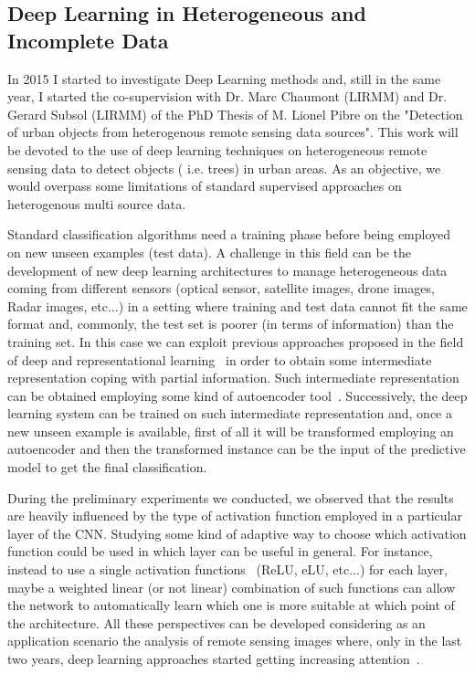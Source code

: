 \subsection{Deep Learning in Heterogeneous and Incomplete Data}
In 2015 I started to investigate Deep Learning methods and, still in the same year, I started the co-supervision with Dr. Marc Chaumont (LIRMM) and Dr. Gerard Subsol (LIRMM) of the PhD Thesis of M. Lionel Pibre on the "Detection of urban objects from heterogenous remote sensing data sources".
This work will be devoted to the use of deep learning techniques on heterogeneous remote sensing data to detect objects ( i.e. trees) in urban areas. As an objective, we would overpass some limitations of standard supervised approaches on heterogenous multi source data.

Standard classification algorithms need a training phase before being employed on new unseen examples (test data). A challenge in this field can be the development of new deep learning architectures to manage heterogeneous data coming from different sensors (optical sensor, satellite images, drone images, Radar images, etc...)  in a setting where training and test data cannot fit the same format and, commonly, the test set is poorer (in terms of information) than the training set. 
In this case we can exploit previous approaches proposed in the field of deep and representational learning~\cite{LeCun15,BengioCV13} in order to obtain some intermediate representation coping with partial information. Such intermediate representation can be obtained employing some kind of autoencoder tool~\cite{VincentLLBM10}.
Successively, the deep learning system can be trained on such intermediate representation and, once a new unseen example is available, first of all it will be transformed employing an autoencoder and then the transformed instance can be the input of the predictive model to get the final classification.

During the preliminary experiments we conducted, we observed that the results are heavily influenced by the type of activation function employed in a particular layer of the CNN. Studying some kind of adaptive way to choose which activation function could be used in which layer can be useful in general. For instance, instead to use a single activation functions~\cite{BengioCV13} (ReLU, eLU, etc...) for each layer, maybe a weighted linear (or not linear) combination of such functions can allow the network to automatically learn which one is more suitable at which point of the architecture.
All these perspectives can be developed considering as an application scenario the analysis of remote sensing images where, only in the last two years, deep learning approaches started getting increasing attention~\cite{LuusSBM15,MarmanisDES16}.


